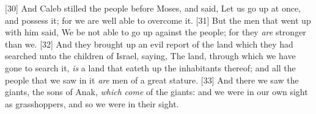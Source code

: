 [30] \textcolor[cmyk]{0.99998,1,0,0}{And Caleb stilled the people before Moses, and said, Let us go up at once, and possess it; for we are well able to overcome it.}
[31] \textcolor[cmyk]{0.99998,1,0,0}{But the men that went up with him said, We be not able to go up against the people; for they \emph{are} stronger than we.}
[32] \textcolor[cmyk]{0.99998,1,0,0}{And they brought up an evil report of the land which they had searched unto the children of Israel, saying, The land, through which we have gone to search it, \emph{is} a land that eateth up the inhabitants thereof; and all the people that we saw in it \emph{are} men of a great stature.}
[33] \textcolor[cmyk]{0.99998,1,0,0}{And there we saw the giants, the sons of Anak, \emph{which} \emph{come} of the giants: and we were in our own sight as grasshoppers, and so we were in their sight.}

